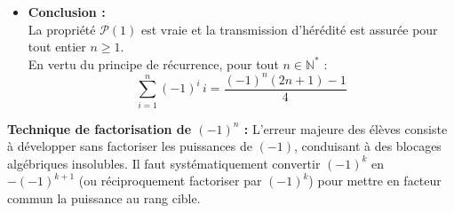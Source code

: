 \documentclass[11pt,a4paper]{article}
\newcommand{\bareme}[1]{\hfill\textbf{\textcolor{secondary}{\sffamily[#1]}}}
\newcommand{\N}{\mathbb{N}}
\begin{document}
\begin{correctionbox}[Corrigé de l'Exercice 4 \bareme{Total : 4 points}]
\begin{itemize}[leftmargin=*, label=$\bullet$]
    Décomposons la somme au rang $k+1$ en isolant son tout dernier terme :
    \[
    \sum_{i=1}^{k+1} (-1)^i \, i = \left(\sum_{i=1}^k (-1)^i \, i\right) + (-1)^{k+1} (k+1)
    \]
    Par application directe de l'hypothèse de récurrence :
    \[
    \sum_{i=1}^{k+1} (-1)^i \, i = \frac{(-1)^k (2k+1) - 1}{4} + (-1)^{k+1} (k+1)
    \]
    Réduisons au même dénominateur $4$ :
    \[
    \sum_{i=1}^{k+1} (-1)^i \, i = \frac{(-1)^k (2k+1) - 1 + 4 \cdot (-1)^{k+1} (k+1)}{4}
    \]
    Utilisons la relation algébrique fondamentale sur les signes alternés :
    \[
    (-1)^k = - (-1)^{k+1} \quad \left(\text{en effet, } (-1)^{k+1} = (-1) \times (-1)^k \iff (-1)^k = -(-1)^{k+1}\right)
    \]
    Substituons cette égalité dans le numérateur :
    \begin{align*}
    \text{Numérateur} &= \Big[ -(-1)^{k+1} \Big] (2k+1) - 1 + 4 \cdot (-1)^{k+1} (k+1) \\
                      &= (-1)^{k+1} \Big[ -(2k+1) + 4(k+1) \Big] - 1 \\
                      &= (-1)^{k+1} \Big[ -2k - 1 + 4k + 4 \Big] - 1 \\
                      &= (-1)^{k+1} (2k + 3) - 1
    \end{align*}
    Or, remarquons que $2k + 3 = 2(k+1) + 1$.\\
    Par conséquent :
    \[
    \sum_{i=1}^{k+1} (-1)^i \, i = \frac{(-1)^{k+1} \big(2(k+1)+1\big) - 1}{4}
    \]
    La proposition $\mathcal{P}(k+1)$ est ainsi établie. L'hérédité est démontrée pour tout $k \in \N^*$.

    \item \textbf{Conclusion :} \bareme{0,5 pt}\\
    La propriété $\mathcal{P}(1)$ est vraie et la transmission d'hérédité est assurée pour tout entier $n \ge 1$.\\
    En vertu du principe de récurrence, pour tout $n \in \N^*$ :
    \[
    \sum_{i=1}^n (-1)^i \, i = \frac{(-1)^n (2n+1) - 1}{4}
    \]
\end{itemize}
\end{correctionbox}

\begin{vigilancebox}
\textbf{Technique de factorisation de $(-1)^n$ :} L'erreur majeure des élèves consiste à développer sans factoriser les puissances de $(-1)$, conduisant à des blocages algébriques insolubles. Il faut systématiquement convertir $(-1)^k$ en $-(-1)^{k+1}$ (ou réciproquement factoriser par $(-1)^k$) pour mettre en facteur commun la puissance au rang cible.
\end{vigilancebox}
\end{document}
